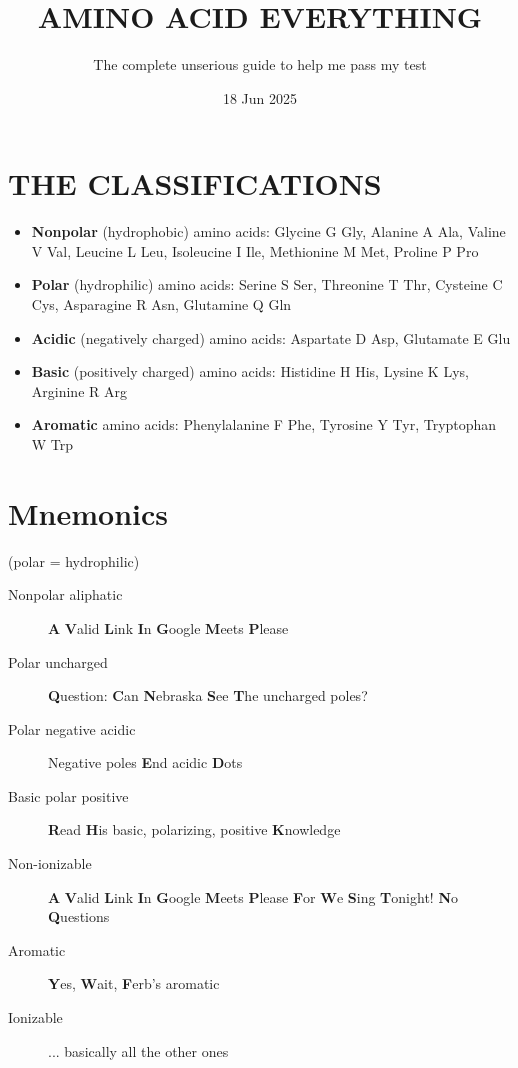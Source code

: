 \documentclass[letterpaper, 12pt]{article}
\title{AMINO ACID EVERYTHING}
\author{The complete unserious guide to help me pass my test}
\date{18 Jun 2025}
\begin{document}
\maketitle

\section*{THE CLASSIFICATIONS}

\begin{itemize}
    \item \textbf{Nonpolar} (hydrophobic) amino acids: Glycine G Gly, Alanine A Ala, Valine V Val, Leucine L Leu, Isoleucine I Ile, Methionine M Met, Proline P Pro
    \item \textbf{Polar} (hydrophilic) amino acids: Serine S Ser, Threonine T Thr, Cysteine C Cys, Asparagine R Asn, Glutamine Q Gln
    \item \textbf{Acidic} (negatively charged) amino acids: Aspartate D Asp, Glutamate E Glu
    \item \textbf{Basic} (positively charged) amino acids: Histidine H His, Lysine K Lys, Arginine R Arg
    \item \textbf{Aromatic} amino acids: Phenylalanine F Phe, Tyrosine Y Tyr, Tryptophan W Trp
\end{itemize}

\section*{Mnemonics}

(polar = hydrophilic)

\begin{description}
    \item[Nonpolar aliphatic] \textbf{A} \textbf{V}alid \textbf{L}ink \textbf{I}n \textbf{G}oogle \textbf{M}eets \textbf{P}lease
    \item [Polar uncharged] \textbf{Q}uestion: \textbf{C}an \textbf{N}ebraska \textbf{S}ee \textbf{T}he uncharged poles?
    \item [Polar negative acidic] Negative poles \textbf{E}nd acidic \textbf{D}ots
    \item [Basic polar positive] \textbf{R}ead \textbf{H}is basic, polarizing, positive \textbf{K}nowledge
    \item [Non-ionizable] \textbf{A} \textbf{V}alid \textbf{L}ink \textbf{I}n \textbf{G}oogle \textbf{M}eets \textbf{P}lease \textbf{F}or \textbf{W}e \textbf{S}ing \textbf{T}onight! \textbf{N}o \textbf{Q}uestions
    \item [Aromatic] \textbf{Y}es, \textbf{W}ait, \textbf{F}erb's aromatic
    \item [Ionizable] ... basically all the other ones
\end{description}
\end{document}
